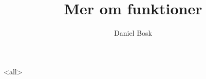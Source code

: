 \documentclass[ignoreframetext]{beamer}
\begin{document}
\title{%
  Mer om funktioner
}
\author{Daniel Bosk}

\begin{frame}
  \maketitle
\end{frame}

\mode<all>

\mode*

\end{document}
